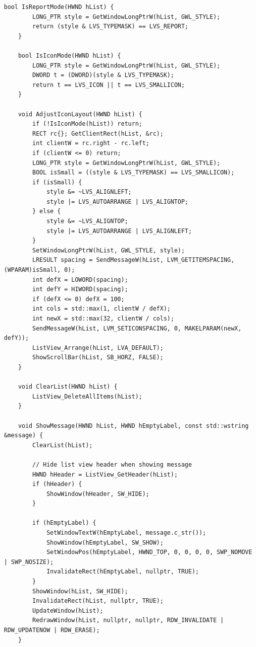 \begin{lstlisting}[style=CodeListing]
    bool IsReportMode(HWND hList) {
        LONG_PTR style = GetWindowLongPtrW(hList, GWL_STYLE);
        return (style & LVS_TYPEMASK) == LVS_REPORT;
    }
    
    bool IsIconMode(HWND hList) {
        LONG_PTR style = GetWindowLongPtrW(hList, GWL_STYLE);
        DWORD t = (DWORD)(style & LVS_TYPEMASK);
        return t == LVS_ICON || t == LVS_SMALLICON;
    }
    
    void AdjustIconLayout(HWND hList) {
        if (!IsIconMode(hList)) return;
        RECT rc{}; GetClientRect(hList, &rc);
        int clientW = rc.right - rc.left;
        if (clientW <= 0) return;
        LONG_PTR style = GetWindowLongPtrW(hList, GWL_STYLE);
        BOOL isSmall = ((style & LVS_TYPEMASK) == LVS_SMALLICON);
        if (isSmall) {
            style &= ~LVS_ALIGNLEFT;
            style |= LVS_AUTOARRANGE | LVS_ALIGNTOP;
        } else {
            style &= ~LVS_ALIGNTOP;
            style |= LVS_AUTOARRANGE | LVS_ALIGNLEFT;
        }
        SetWindowLongPtrW(hList, GWL_STYLE, style);
        LRESULT spacing = SendMessageW(hList, LVM_GETITEMSPACING, (WPARAM)isSmall, 0);
        int defX = LOWORD(spacing);
        int defY = HIWORD(spacing);
        if (defX <= 0) defX = 100;
        int cols = std::max(1, clientW / defX);
        int newX = std::max(32, clientW / cols);
        SendMessageW(hList, LVM_SETICONSPACING, 0, MAKELPARAM(newX, defY));
        ListView_Arrange(hList, LVA_DEFAULT);
        ShowScrollBar(hList, SB_HORZ, FALSE);
    }
    
    void ClearList(HWND hList) {
        ListView_DeleteAllItems(hList);
    }
    
    void ShowMessage(HWND hList, HWND hEmptyLabel, const std::wstring &message) {
        ClearList(hList);
        
        // Hide list view header when showing message
        HWND hHeader = ListView_GetHeader(hList);
        if (hHeader) {
            ShowWindow(hHeader, SW_HIDE);
        }
        
        if (hEmptyLabel) {
            SetWindowTextW(hEmptyLabel, message.c_str());
            ShowWindow(hEmptyLabel, SW_SHOW);
            SetWindowPos(hEmptyLabel, HWND_TOP, 0, 0, 0, 0, SWP_NOMOVE | SWP_NOSIZE);
            InvalidateRect(hEmptyLabel, nullptr, TRUE);
        }
        ShowWindow(hList, SW_HIDE);
        InvalidateRect(hList, nullptr, TRUE);
        UpdateWindow(hList);
        RedrawWindow(hList, nullptr, nullptr, RDW_INVALIDATE | RDW_UPDATENOW | RDW_ERASE);
    }
    

\end{lstlisting}
